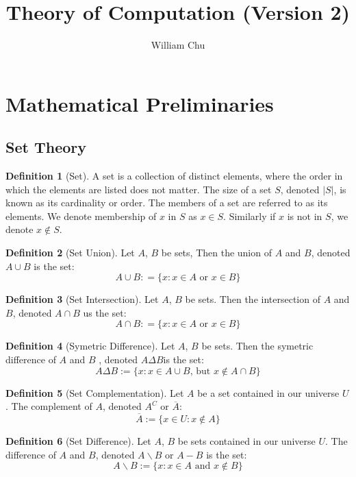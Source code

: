 \documentclass{article}
\title{Theory of Computation (Version 2)}
\author{William Chu}
\theoremstyle{definition}
\newtheorem{define}{Definition}[subsection]
\begin{document}
 
\maketitle
 
\tableofcontents

\section{Mathematical Preliminaries}
\subsection{Set Theory} 
\begin{define}[Set]
A set is a collection of distinct elements, where the order in which the elements are listed does not matter. The size of a set $S$, denoted $|S|$, is known as its cardinality or order. The members of a set are referred to as its elements. We denote membership of $x$ in $S$ as $x \in S$. Similarly if $x$ is not in $S$, we denote $x \notin S$.
\end{define}

\begin{define}[Set Union]
Let $A$, $B$ be sets, Then the union of $A$ and $B$, denoted $A\cup B$ is the set: $$A\cup B: = \{x: x\in A \text{ or } x \in B\}$$
\end{define}

\begin{define}[Set Intersection]
Let $A$, $B$ be sets. Then the intersection of $A$ and $B$, denoted $A\cap B$ us the set: $$A \cap B: = \{x: x\in A\text{ or }x \in B\}$$
\end{define}

\begin{define}[Symetric Difference]
Let $A$, $B$ be sets. Then the symetric difference of $A$ and $B$ , denoted $A\Delta B$is the set: $$A\Delta B := \{x:x\in A\cup B\text{, but }x\notin A\cap B\}$$
\end{define}

\begin{define}[Set Complementation]
Let $A$ be a set contained in our universe $U$. The complement of $A$, denoted $A^{C}$ or $\overline{A}$: $$ \overline{A}:= \{x\in U :x\notin A\}$$
\end{define}

\begin{define}[Set Difference]
Let $A$, $B$ be sets contained in our universe $U$. The difference of $A$ and $B$, denoted $A\backslash B$ or $A-B$ is the set: $$A\backslash B:=\{x:x\in A\text{ and }x\notin B\}$$
\end{define}
\end{document}
